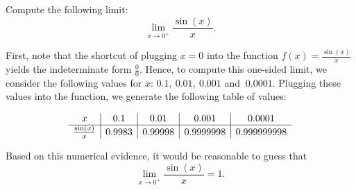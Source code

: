 \documentclass{ximera}
\begin{document}
\begin{example}[example 4]
Compute the following limit: 
\[\lim_{x \to 0^+} \frac{\sin(x)}{x}.\]

First, note that the shortcut of plugging $x=0$ into the 
function $\displaystyle{f(x)= \frac{\sin(x)}{x}}$ yields the indeterminate form $\frac{0}{0}$.
Hence, to compute this one-sided limit, we consider the following values for $x$: $0.1,\ 0.01,\ 0.001$ and $\ 0.0001$.
Plugging these values into the function, we generate the following table of values:

\[
\begin{array}{ c | c | c | c | c }
  x & 0.1 & 0.01  & 0.001 & 0.0001 \\ 
	\hline 
	 \frac{\sin(x)}{x} & 0.9983 & 0.99998 & 0.9999998 & 0.999999998
\end{array}
\]  

Based on this numerical evidence, 
it would be reasonable to guess that 
\[\lim_{x \to 0^{+}} \frac{\sin(x)}{x} = 1.\]













\end{example}

	   
\end{document}
